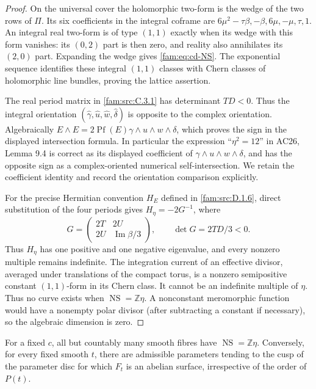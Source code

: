 \begin{proof}
On the universal cover the holomorphic two-form is the wedge of the two
rows of \(\Pi\). Its six coefficients in the integral coframe are
\(6\mu^2-\tau\beta,-\beta,6\mu,-\mu,\tau,1\).
An integral real two-form is of type \((1,1)\) exactly when its wedge
with this form vanishes: its \((0,2)\) part is then zero, and reality
also annihilates its \((2,0)\) part. Expanding the wedge gives
\eqref{fam:eq:cd-NS}. The exponential sequence identifies these integral
\((1,1)\) classes with Chern classes of holomorphic line bundles, proving
the lattice assertion.

The real period matrix in \ref{fam:src:C.3.1} has determinant \(TD<0\). Thus the
integral orientation \((\widehat\gamma,\widehat u,\widehat w,
\widehat\delta)\) is opposite to the complex orientation. Algebraically
\(E\wedge E=2\operatorname{Pf}(E)\gamma\wedge u\wedge w\wedge\delta\),
which proves the sign in the displayed intersection formula. In
particular the expression ``\(\eta^2=12\)'' in AC26, Lemma 9.4 is correct
as its displayed coefficient of \(\gamma\wedge u\wedge w\wedge\delta\),
and has the opposite sign as a complex-oriented numerical
self-intersection. We retain the coefficient identity and record the
orientation comparison explicitly.

For the precise Hermitian convention $H_E$ defined in \ref{fam:src:D.1.6}, direct
substitution of the four periods gives $H_\eta=-2G^{-1}$, where
\[
 G=\begin{pmatrix}2T&2U\\2U&\operatorname{Im}\beta/3\end{pmatrix},
 \qquad \det G=2TD/3<0.
\]
Thus $H_\eta$ has one positive and one negative eigenvalue, and every
nonzero multiple remains indefinite. The integration
current of an effective divisor, averaged under translations of the
compact torus, is a nonzero semipositive constant \((1,1)\)-form in its
Chern class. It cannot be an indefinite multiple of \(\eta\).
Thus no curve exists when \(\operatorname{NS}=\mathbb Z\eta\).
A nonconstant meromorphic function would have a nonempty polar divisor
(after subtracting a constant if necessary), so the algebraic dimension
is zero.
\end{proof}

\begin{proposition}\label{fam:src:D.1.5}\label{fam:st:D.1.5}
For a fixed \(c\), all but countably many smooth fibres have
\(\operatorname{NS}=\mathbb Z\eta\). Conversely, for every fixed smooth
\(t\), there are admissible parameters tending to the cusp of the
parameter disc for which \(F_t\) is an abelian surface, irrespective of
the order of \(P(t)\).
\end{proposition}

